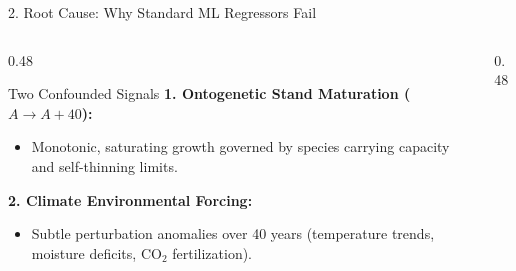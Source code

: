 \documentclass[aspectratio=169,10pt]{beamer}
\begin{document}
\begin{frame}{2. Root Cause: Why Standard ML Regressors Fail}
\begin{columns}[T]
    \begin{column}{0.48\textwidth}
        \begin{alertblock}{Two Confounded Signals}
        \textbf{1. Ontogenetic Stand Maturation ($A \to A+40$):}
        \begin{itemize}
            \item Monotonic, saturating growth governed by species carrying capacity and self-thinning limits.
        \end{itemize}
        \textbf{2. Climate Environmental Forcing:}
        \begin{itemize}
            \item Subtle perturbation anomalies over 40 years (temperature trends, moisture deficits, $\text{CO}_2$ fertilization).
        \end{itemize}
        \end{alertblock}
    \end{column}
    \begin{column}{0.48\textwidth}
    \end{column}
\end{columns}
\end{frame}
\end{document}
